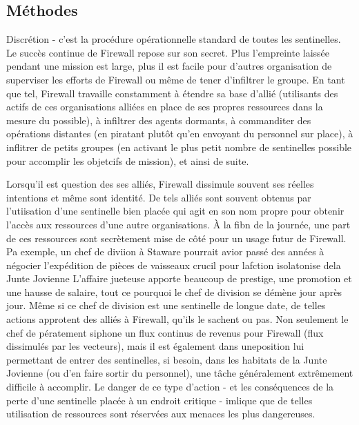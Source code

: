 \subsection{Méthodes} 

Discrétion - c'est la procédure opérationnelle standard de toutes les sentinelles. Le succès continue de Firewall repose sur son secret. Plus l'empreinte laissée pendant une mission est large, plus il est facile pour d'autres organisation de superviser les efforts de Firewall ou même de tener d'infiltrer le groupe. En tant que tel, Firewall travaille constamment à étendre sa base d'allié (utilisants des actifs de ces organisations alliées en place de ses propres ressources dans la mesure du possible), à infiltrer des agents dormants, à commanditer des opérations distantes (en piratant plutôt qu'en envoyant du personnel sur place), à inflitrer de petits groupes (en activant le plus petit nombre de sentinelles possible pour accomplir les objetcifs de mission), et ainsi de suite. 

Lorsqu'il est question des ses alliés, Firewall dissimule souvent ses réelles intentions et même sont identité. De tels alliés sont souvent obtenus par l'utiisation d'une sentinelle bien placée qui agit en son nom propre pour obtenir l'accès aux ressources d'une autre organisations. À la fibn de la journée, une part de ces ressources sont secrètement mise de côté pour un usage futur de Firewall. Pa exemple, un chef de diviion à Staware pourrait avior passé des années à négocier l'expédition de pièces de vaisseaux crucil pour lafction isolatonise dela Junte Jovienne L'affaire jueteuse apporte beaucoup de prestige, une promotion et une hausse de salaire, tout ce pourquoi le chef de division se démène jour après jour. Même si ce chef de division est une sentinelle de longue date, de telles actions approtent des alliés à Firewall, qu'ils le sachent ou pas. Non seulement le chef de pératement siphone un flux continus de revenus pour Firewall (flux dissimulés par les vecteurs), mais il est également dans uneposition lui permettant de entrer des sentinelles, si besoin, dans les habitats de la Junte Jovienne (ou d'en faire sortir du personnel), une tâche généralement extrêmement difficile à accomplir. Le danger de ce type d'action - et les conséquences de la perte d'une sentinelle placée à un endroit critique - imlique que de telles utilisation de ressources sont réservées aux menaces les plus dangereuses. 

